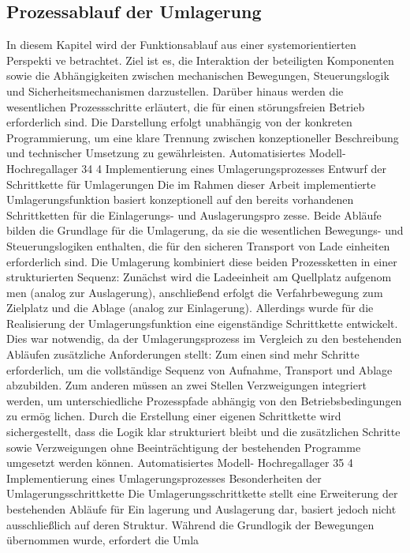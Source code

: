 \subsection{Prozessablauf der Umlagerung}
In diesem Kapitel wird der Funktionsablauf aus einer systemorientierten Perspekti
ve betrachtet. Ziel ist es, die Interaktion der beteiligten Komponenten sowie die
Abhängigkeiten zwischen mechanischen Bewegungen, Steuerungslogik und
Sicherheitsmechanismen darzustellen. Darüber hinaus werden die wesentlichen
Prozessschritte erläutert, die für einen störungsfreien Betrieb erforderlich sind. Die
Darstellung erfolgt unabhängig von der konkreten Programmierung, um eine klare
Trennung zwischen konzeptioneller Beschreibung und technischer Umsetzung zu
gewährleisten.
Automatisiertes Modell- Hochregallager
34
4 Implementierung eines Umlagerungsprozesses
Entwurf der Schrittkette für Umlagerungen
Die im Rahmen dieser Arbeit implementierte Umlagerungsfunktion basiert konzeptionell
auf den bereits vorhandenen Schrittketten für die Einlagerungs- und Auslagerungspro
zesse. Beide Abläufe bilden die Grundlage für die Umlagerung, da sie die wesentlichen
Bewegungs- und Steuerungslogiken enthalten, die für den sicheren Transport von Lade
einheiten erforderlich sind. Die Umlagerung kombiniert diese beiden Prozessketten in
einer strukturierten Sequenz: Zunächst wird die Ladeeinheit am Quellplatz aufgenom
men (analog zur Auslagerung), anschließend erfolgt die Verfahrbewegung zum Zielplatz
und die Ablage (analog zur Einlagerung).
Allerdings wurde für die Realisierung der Umlagerungsfunktion eine eigenständige
Schrittkette entwickelt. Dies war notwendig, da der Umlagerungsprozess im Vergleich
zu den bestehenden Abläufen zusätzliche Anforderungen stellt: Zum einen sind mehr
Schritte erforderlich, um die vollständige Sequenz von Aufnahme, Transport und Ablage
abzubilden. Zum anderen müssen an zwei Stellen Verzweigungen integriert werden,
um unterschiedliche Prozesspfade abhängig von den Betriebsbedingungen zu ermög
lichen. Durch die Erstellung einer eigenen Schrittkette wird sichergestellt, dass die
Logik klar strukturiert bleibt und die zusätzlichen Schritte sowie Verzweigungen ohne
Beeinträchtigung der bestehenden Programme umgesetzt werden können.
Automatisiertes Modell- Hochregallager
35
4 Implementierung eines Umlagerungsprozesses
Besonderheiten der Umlagerungsschrittkette
Die Umlagerungsschrittkette stellt eine Erweiterung der bestehenden Abläufe für Ein
lagerung und Auslagerung dar, basiert jedoch nicht ausschließlich auf deren Struktur.
Während die Grundlogik der Bewegungen übernommen wurde, erfordert die Umla

